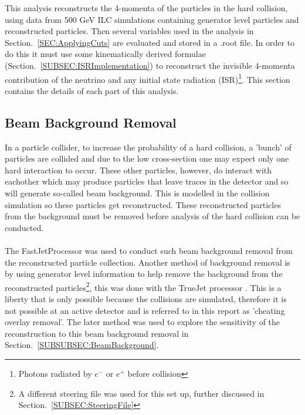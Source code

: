 This analysis reconstructs the 4-momenta of the particles in the hard collision, using data from 500 GeV ILC simulations containing generator level particles and reconstructed particles. Then several variables used in the analysis in Section.~\ref{SEC:ApplyingCuts} are evaluated and stored in a .root file. In order to do this it must use some kinematically derived formulae (Section.~\ref{SUBSEC:ISRImplementation}) to reconstruct the invisible 4-momenta contribution of the neutrino and any initial state radiation (ISR)\footnote{Photons radiated by ${e}^{-}$ or ${e}^{+}$ before collision}. This section contains the details of each part of this analysis.

\subsection{Beam Background Removal}
\label{SUBSEC:BeamBackgroundRemoval}
In a particle collider, to increase the probability of a hard collision, a 'bunch' \cite{bunch} of particles are collided and due to the low cross-section one may expect only one hard interaction to occur. These other particles, however, do interact with eachother which may produce particles that leave traces in the detector and so will generate so-called beam background. This is modelled in the collision simulation so these particles get reconstructed. These reconstructed particles from the background must be removed before analysis of the hard collision can be conducted.
\\\\
The FastJetProcessor \cite{FastJet} was used to conduct such beam background removal from the reconstructed particle collection. Another method of background removal is by using generator level information to help remove the background from the reconstructed particles\footnote{A different steering file was used for this set up, further discussed in Section.~\ref{SUBSEC:SteeringFile}}, this was done with the TrueJet processor \cite{TrueJet}. This is a liberty that is only possible because the collisions are simulated, therefore it is not possible at an active detector and is referred to in this report as 'cheating overlay removal'. The later method was used to explore the sensitivity of the reconstruction to this beam background removal in Section.~\ref{SUBSUBSEC:BeamBackground}.

